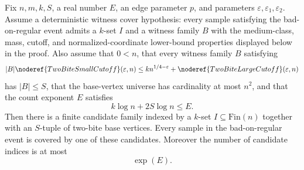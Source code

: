 \begin{helper}
Fix \(n,m,k,S\), a real number \(E\), an edge parameter \(p\), and parameters
\(\varepsilon,\varepsilon_1,\varepsilon_2\).  Assume a deterministic witness
cover hypothesis: every sample satisfying the bad-on-regular event admits a
\(k\)-set \(I\) and a witness family \(B\) with the medium-class, mass,
cutoff, and normalized-coordinate lower-bound properties displayed below in
the proof.  Also assume that \(0<n\), that
every witness family \(B\) satisfying
\[
|B|\noderef{TwoBiteSmallCutoff}(\varepsilon,n)
\le
k n^{1/4-\varepsilon}+\noderef{TwoBiteLargeCutoff}(\varepsilon,n)
\]
has \(|B|\le S\), that the base-vertex universe has cardinality at most
\(n^2\), and that the count exponent \(E\) satisfies
\[
k\log n+2S\log n\le E.
\]
Then there is a finite candidate family indexed by a \(k\)-set
\(I\subseteq\mathrm{Fin}(n)\) together with an \(S\)-tuple of two-bite base
vertices.  Every sample in the bad-on-regular event is covered by one of these
candidates.  Moreover the number of candidate indices is at most
\[
\exp(E).
\]
\end{helper}
